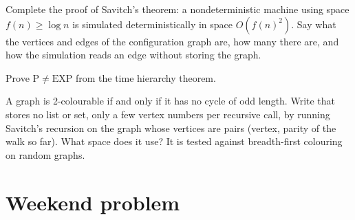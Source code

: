 \begin{exercise}[$\star\star\star$]\label{exo:b3:complexity-classes:10}
Complete the proof of Savitch's theorem: a nondeterministic machine using space $f(n) \ge \log n$ is simulated deterministically in space $O(f(n)^2)$. Say what the vertices and edges of the configuration graph are, how many there are, and how the simulation reads an edge without storing the graph.
\end{exercise}

\begin{exercise}[$\star\star\star$]\label{exo:b3:complexity-classes:11}
Prove $\mathrm{P} \ne \mathrm{EXP}$ from the time hierarchy theorem.
\end{exercise}

\begin{exercise}[$\star\star\star$]\label{exo:b3:complexity-classes:12}
A graph is 2-colourable if and only if it has no cycle of odd length. Write  that stores no list or set, only a few vertex numbers per recursive call, by running Savitch's recursion on the graph whose vertices are pairs (vertex, parity of the walk so far). What space does it use? It is tested against breadth-first colouring on random graphs.
\end{exercise}

\section{Weekend problem}\label{sec:b3:complexity-classes:problem}

